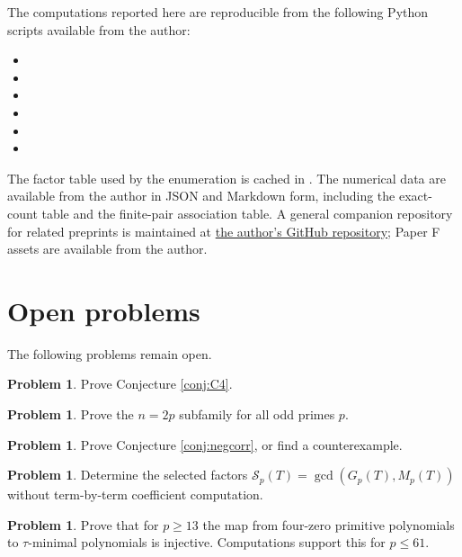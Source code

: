 \documentclass[11pt]{article}
\theoremstyle{definition}
\newtheorem{problem}[theorem]{Problem}
\theoremstyle{remark}
\begin{document}
The computations reported here are reproducible from the following Python scripts available from the author:
\begin{itemize}
\item {}
\item {}
\item {}
\item {}
\item {}
\item {}
\end{itemize}
The factor table used by the enumeration is cached in . The numerical data are available from the author in JSON and Markdown form, including the exact-count table and the finite-pair association table. A general companion repository for related preprints is maintained at \href{https://github.com/63183349121/yijing-mathematical-structures}{the author's GitHub repository}; Paper F assets are available from the author.

\section{Open problems}
\label{sec:open}

The following problems remain open.

\begin{problem}
Prove Conjecture \ref{conj:C4}.
\end{problem}

\begin{problem}
Prove the $n=2p$ subfamily for all odd primes $p$.
\end{problem}

\begin{problem}
Prove Conjecture \ref{conj:negcorr}, or find a counterexample.
\end{problem}

\begin{problem}
Determine the selected factors $\mathcal S_p(T)=\gcd(G_p(T),M_p(T))$ without term-by-term coefficient computation.
\end{problem}

\begin{problem}
Prove that for $p\ge13$ the map from four-zero primitive polynomials to $\tau$-minimal polynomials is injective. Computations support this for $p\le61$.
\end{problem}
\end{document}
